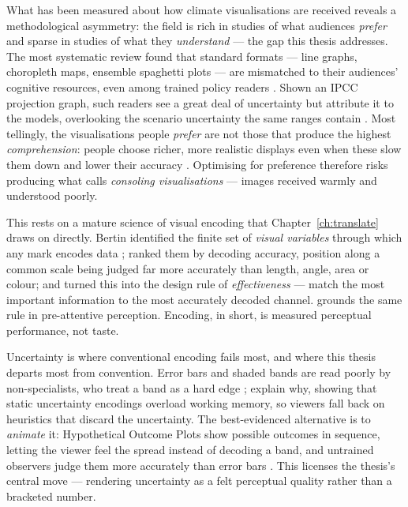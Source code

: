 What has been measured about how climate visualisations are received reveals a methodological asymmetry: the field is rich in studies of what audiences \emph{prefer} and sparse in studies of what they \emph{understand} --- the gap this thesis addresses. The most systematic review found that standard formats --- line graphs, choropleth maps, ensemble spaghetti plots --- are mismatched to their audiences' cognitive resources, even among trained policy readers \citep{harold2016}. Shown an IPCC projection graph, such readers see a great deal of uncertainty but attribute it to the models, overlooking the scenario uncertainty the same ranges contain \parencite{mcmahon2015}. Most tellingly, the visualisations people \emph{prefer} are not those that produce the highest \emph{comprehension}: people choose richer, more realistic displays even when these slow them down and lower their accuracy \parencite{hegarty2012}. Optimising for preference therefore risks producing what \citet{sheppard2015} calls \emph{consoling visualisations} --- images received warmly and understood poorly.

This rests on a mature science of visual encoding that Chapter~\ref{ch:translate} draws on directly. Bertin identified the finite set of \emph{visual variables} through which any mark encodes data \citep{bertin1983}; \citet{clevelandmcgill1984} ranked them by decoding accuracy, position along a common scale being judged far more accurately than length, angle, area or colour; and \citet{munzner2014} turned this into the design rule of \emph{effectiveness} --- match the most important information to the most accurately decoded channel. \citet{ware2021} grounds the same rule in pre-attentive perception. Encoding, in short, is measured perceptual performance, not taste.



Uncertainty is where conventional encoding fails most, and where this thesis departs most from convention. Error bars and shaded bands are read poorly by non-specialists, who treat a band as a hard edge \citep{spiegelhalter2017}; \citet{padilla2018} explain why, showing that static uncertainty encodings overload working memory, so viewers fall back on heuristics that discard the uncertainty. The best-evidenced alternative is to \emph{animate} it: Hypothetical Outcome Plots show possible outcomes in sequence, letting the viewer feel the spread instead of decoding a band, and untrained observers judge them more accurately than error bars \citep{hullman2015hops, kale2019hops}. This licenses the thesis's central move --- rendering uncertainty as a felt perceptual quality rather than a bracketed number.

